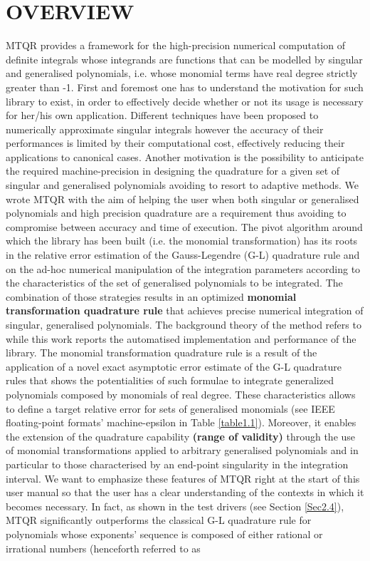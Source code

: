 \documentclass[a4paper, twosided]{book}
\begin{document}
\section[Overview]{\changefont OVERVIEW}\label{Sec1.1}

\noindent
MTQR provides a framework for the high-precision numerical computation of definite integrals whose integrands are functions that can be modelled by singular and generalised polynomials, i.e. whose monomial terms have real degree strictly greater than -1. First and foremost one has to understand the motivation for such library to exist, in order to effectively decide whether or not its usage is necessary for her/his own application. Different techniques have been proposed to numerically approximate singular integrals however the accuracy of their performances is limited by their computational cost, effectively reducing their applications to canonical cases. Another motivation is the possibility to anticipate the required machine-precision in designing the quadrature for a given set of singular and generalised polynomials avoiding to resort to adaptive methods. We wrote MTQR with the aim of helping the user when both singular or generalised polynomials and high precision quadrature are a requirement thus avoiding to compromise between accuracy and time of execution. The pivot algorithm around which the library has been built (i.e. the monomial transformation) has its roots in the relative error estimation of the Gauss-Legendre (G-L) quadrature rule and on the ad-hoc numerical manipulation of the integration parameters \cite{Lombardi21} according to the characteristics of the set of generalised polynomials to be integrated. The combination of those strategies results in an optimized \color{poliDarkBlue} \textbf{monomial transformation quadrature rule} \color{black} that achieves precise numerical integration of singular, generalised polynomials. The background theory of the method refers to \cite{Lombardi09} while this work reports the automatised implementation and performance of the library. The monomial transformation quadrature rule is a result of the application of a novel exact asymptotic error estimate of the G-L quadrature rules that shows the potentialities of such formulae to integrate generalized polynomials composed by monomials of real degree. These characteristics allows to define a  target relative error for sets of generalised monomials (see IEEE floating-point formats' machine-epsilon in Table \ref{table1.1}). Moreover, it enables the extension of the quadrature capability  \color{poliDarkBlue} \textbf{(range of validity)} \color{black} through the use of monomial transformations applied to arbitrary generalised polynomials and in particular to those characterised by an end-point singularity in the integration interval. We want to emphasize these features of MTQR right at the start of this user manual so that the user has a clear understanding of the contexts in which it becomes necessary. In fact, as shown in the test drivers (see Section \ref{Sec2.4}), MTQR significantly outperforms the classical G-L quadrature rule for polynomials whose exponents' sequence is composed of either rational or irrational numbers (henceforth referred to as 
\end{document}
